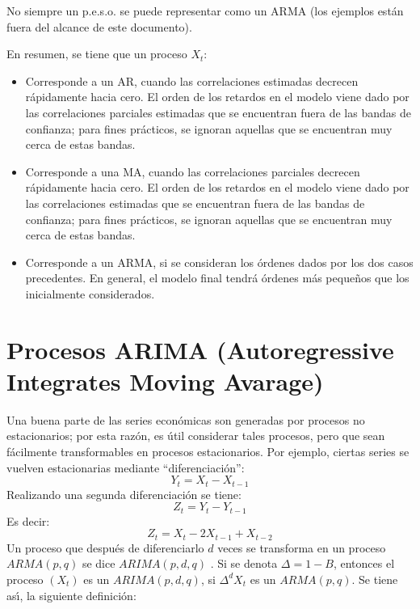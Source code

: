 \begin{observacion}
 No siempre un p.e.s.o. se puede representar 
como un ARMA (los ejemplos est\'{a}n fuera del alcance de este documento).
\end{observacion}

\begin{observacion}
 En resumen, se tiene que un proceso $X_{t}$:
\begin{itemize}
\item Corresponde a un AR, cuando las correlaciones estimadas decrecen r\'{a}pidamente hacia cero. El orden de los retardos en el modelo viene dado por las correlaciones parciales estimadas que se encuentran fuera de las bandas de confianza; para fines pr\'{a}cticos, se ignoran aquellas que se encuentran muy cerca de estas bandas.
\item Corresponde a una MA, cuando las correlaciones parciales decrecen r\'{a}pidamente hacia cero. El orden de los retardos en el modelo viene dado por las correlaciones estimadas que se encuentran fuera de las bandas de confianza; para fines pr\'{a}cticos, se ignoran aquellas que se encuentran muy cerca de estas bandas.
\item Corresponde a un ARMA, si se consideran los \'{o}rdenes dados por los dos casos precedentes. En general, el modelo final tendr\'{a} \'{o}rdenes m\'{a}s peque\~{n}os que los inicialmente considerados.
\end{itemize}
\end{observacion}


\section{Procesos ARIMA (Autoregressive Integrates Moving Avarage)}

Una buena parte de las series econ\'{o}micas son generadas por procesos no 
estacionarios; por esta raz\'{o}n, es \'{u}til considerar tales procesos, 
pero que sean f\'{a}cilmente transformables en procesos estacionarios. Por 
ejemplo, ciertas series se vuelven estacionarias mediante 
``diferenciaci\'{o}n'':
\[
Y_{t}=X_{t}-X_{t-1}
\]
Realizando una segunda diferenciaci\'{o}n se tiene:
\[
Z_{t}=Y_{t}-Y_{t-1}
\]
Es decir:
\[
Z_{t}=X_{t}-2X_{t-1}+X_{t-2}
\]
Un proceso que despu\'{e}s de diferenciarlo $d$ veces se transforma en un proceso $ARMA (p,q)$ se dice $ARIMA (p,d,q)$ . Si se denota $\Delta  = 1-B$, 
entonces el proceso $(X_{t})$ es un $ARIMA (p,d,q)$, si 
${\Delta }^{d}X_{t}$ es un $ARMA (p,q)$. Se tiene as\'{\i}, 
la siguiente definici\'{o}n:

